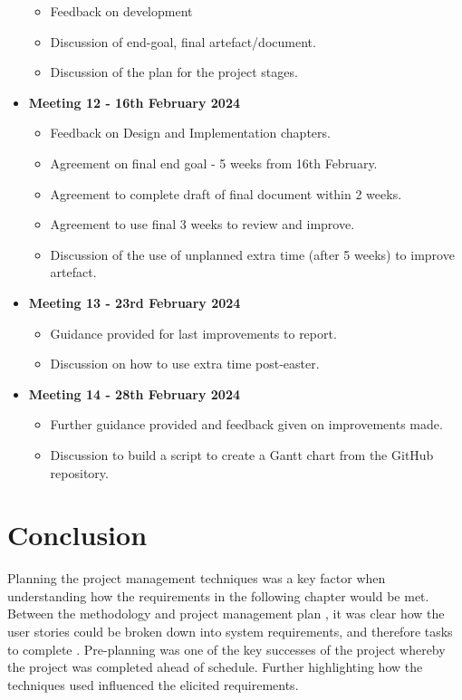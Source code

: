\begin{itemize}
    \begin{itemize}
        \item Feedback on development
        \item Discussion of end-goal, final artefact/document.
        \item Discussion of the plan for the project stages.
    \end{itemize}
    \item \textbf{Meeting 12 - 16th February 2024}
    \begin{itemize}
        \item Feedback on Design and Implementation chapters.
        \item Agreement on final end goal - 5 weeks from 16th February.
        \item Agreement to complete draft of final document within 2 weeks.
        \item Agreement to use final 3 weeks to review and improve.
        \item Discussion of the use of unplanned extra time (after 5 weeks) to improve artefact.
    \end{itemize}
    \item \textbf{Meeting 13 - 23rd February 2024}
    \begin{itemize}
        \item Guidance provided for last improvements to report.
        \item Discussion on how to use extra time post-easter.
    \end{itemize}
    \item \textbf{Meeting 14 - 28th February 2024}
    \begin{itemize}
        \item Further guidance provided and feedback given on improvements made.
        \item Discussion to build a script to create a Gantt chart from the GitHub repository.
    \end{itemize}
\end{itemize}

\section{Conclusion}
\label{pm:conclusion}

Planning the project management techniques was a key factor when understanding how the requirements in the following chapter would be met. Between the methodology  and project management plan , it was clear how the user stories could be broken down into system requirements, and therefore tasks to complete . Pre-planning was one of the key successes of the project whereby the project was completed ahead of schedule. Further highlighting how the techniques used influenced the elicited requirements.